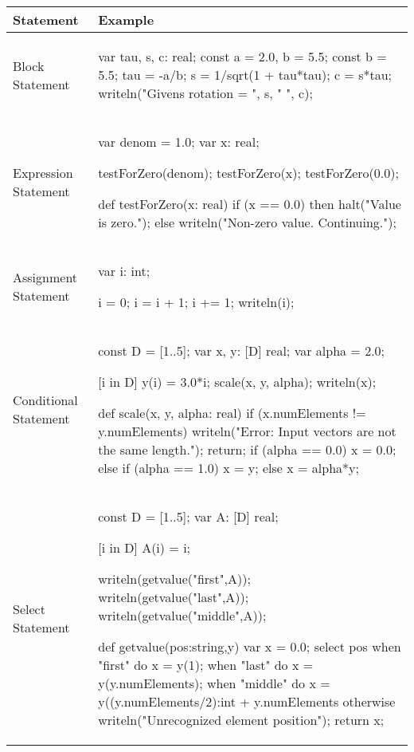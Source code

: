 \begin{center}
\begin{tabular}{|l|l|}
\hline
{\bf Statement} & {\bf Example} \\
\hline
Block Statement &
\begin{chapel} %
var tau, s, c: real;
const a = 2.0, b = 5.5;
const b = 5.5;
{
tau = -a/b;
s = 1/sqrt(1 + tau*tau);
c = s*tau;
}
writeln("Givens rotation = ", s, " ", c);
\end{chapel} \\
\hline
Expression Statement & 
\begin{chapel} %
var denom = 1.0;
var x: real;

testForZero(denom);
testForZero(x);
testForZero(0.0);

def testForZero(x: real) {
  if (x == 0.0) then halt("Value is zero.");
  else writeln("Non-zero value.  Continuing.");   
}
\end{chapel} \\
\hline
Assignment Statement & 
\begin{chapel} %
var i: int;

i = 0;
i = i + 1;
i += 1;
writeln(i);
\end{chapel} \\
\hline
Conditional Statement &
\begin{chapel} %
const D = [1..5];
var x, y: [D] real;
var alpha = 2.0;

[i in D] y(i) = 3.0*i;
scale(x, y, alpha);
writeln(x);

def scale(x, y, alpha: real) {
  if (x.numElements != y.numElements) {
    writeln("Error:  Input vectors are not the same length.");
    return;
  }
  if (alpha == 0.0) {
    x = 0.0;
  } else if (alpha == 1.0) {
    x = y;
  } else {
    x = alpha*y;
  }
}
\end{chapel} \\
\hline
Select Statement &
\begin{chapel} %
const D = [1..5];
var A: [D] real;

[i in D] A(i) = i;

writeln(getvalue("first",A));
writeln(getvalue("last",A));
writeln(getvalue("middle",A));

def getvalue(pos:string,y) {
  var x = 0.0;
  select pos {
    when "first" do x = y(1);
    when "last" do x = y(y.numElements);
    when "middle" do x = y((y.numElements/2):int + y.numElements%
    otherwise writeln("Unrecognized element position");
  }
  return x;
}
\end{chapel} \\
\hline
\end{tabular}


\end{center}
